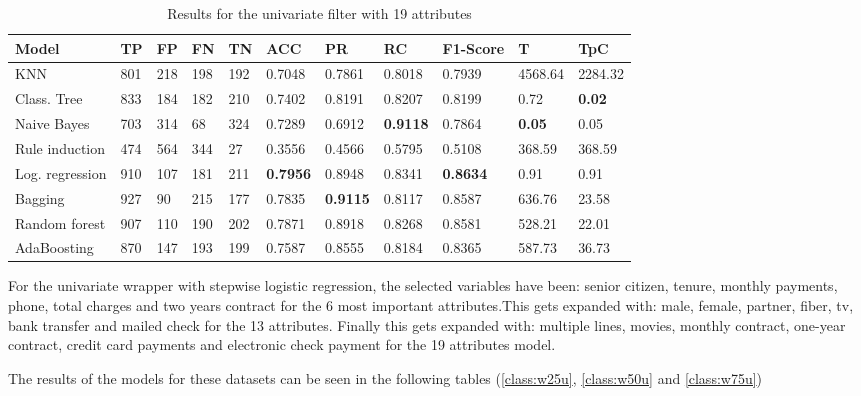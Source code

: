 \documentclass[a4paper,11pt]{article}
\begin{document}
\begin{table}
\centering
\begin{tabular}{|l|l|l|l|l|l|l|l|l|l|l|}
\hline

\textbf{Model} & \textbf{TP} & \textbf{FP} & \textbf{FN} & \textbf{TN} & \textbf{ACC} & \textbf{PR} & \textbf{RC} & \textbf{F1-Score} & \textbf{T} & \textbf{TpC} \\ \hline
KNN & 801 & 218 & 198 & 192 & 0.7048 & 0.7861 & 0.8018 & 0.7939 & 4568.64 & 2284.32 \\ \hline
Class. Tree & 833 & 184 & 182 & 210 & 0.7402 & 0.8191 & 0.8207 & 0.8199 & 0.72 & \textbf{0.02} \\ \hline
Naive Bayes & 703 & 314 & 68 & 324 & 0.7289 & 0.6912 & \textbf{0.9118} & 0.7864 & \textbf{0.05} & 0.05 \\ \hline
Rule induction & 474 & 564 & 344 & 27 & 0.3556 & 0.4566 & 0.5795 & 0.5108 & 368.59 & 368.59 \\ \hline
Log. regression & 910 & 107 & 181 & 211 & \textbf{0.7956} & 0.8948 & 0.8341 & \textbf{0.8634} & 0.91 & 0.91 \\ \hline
Bagging & 927 & 90 & 215 & 177 & 0.7835 & \textbf{0.9115} & 0.8117 & 0.8587 & 636.76 & 23.58 \\ \hline
Random forest & 907 & 110 & 190 & 202 & 0.7871 & 0.8918 & 0.8268 & 0.8581 & 528.21 & 22.01 \\ \hline
AdaBoosting & 870 & 147 & 193 & 199 & 0.7587 & 0.8555 & 0.8184 & 0.8365 & 587.73 & 36.73 \\ \hline

\end{tabular}
\caption{Results for the univariate filter with 19 attributes}
\label{class:f75u}
\end{table}

For the univariate wrapper with stepwise logistic regression, the selected variables have been: senior citizen, tenure, monthly payments, phone, total charges and two years contract for the 6 most important attributes.This gets expanded with: male, female, partner, fiber, tv, bank transfer and mailed check for the 13 attributes. Finally this gets expanded with: multiple lines, movies, monthly contract, one-year contract, credit card payments and electronic check payment for the 19 attributes model.

The results of the models for these datasets can be seen in the following tables (\ref{class:w25u}, \ref{class:w50u} and \ref{class:w75u})
\end{document}
